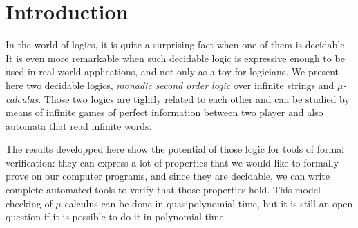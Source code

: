 







\section*{Introduction}

In the world of logics, it is
quite a surprising fact when one of them is decidable.
It is even more remarkable when such decidable logic
is expressive enough to be used in real world applications,
and not only as a toy for logicians.
We present here two decidable logics,
\textit{monadic second order logic} over infinite strings
and \textit{$\mu$-calculus}.
Those two logics are tightly related to each other
and can be studied by means of infinite games of perfect information
between two player and also automata that read infinite words.

The results developped here show the potential of those logic
for tools of formal verification: they can express a lot of properties
that we would like to formally prove on our computer programs,
and since they are decidable, we can write complete automated tools
to verify that those properties hold. This model checking
of $\mu$-calculus can be done in quasipolynomial time,
but it is still an open question if it is possible to do it in polynomial time.


